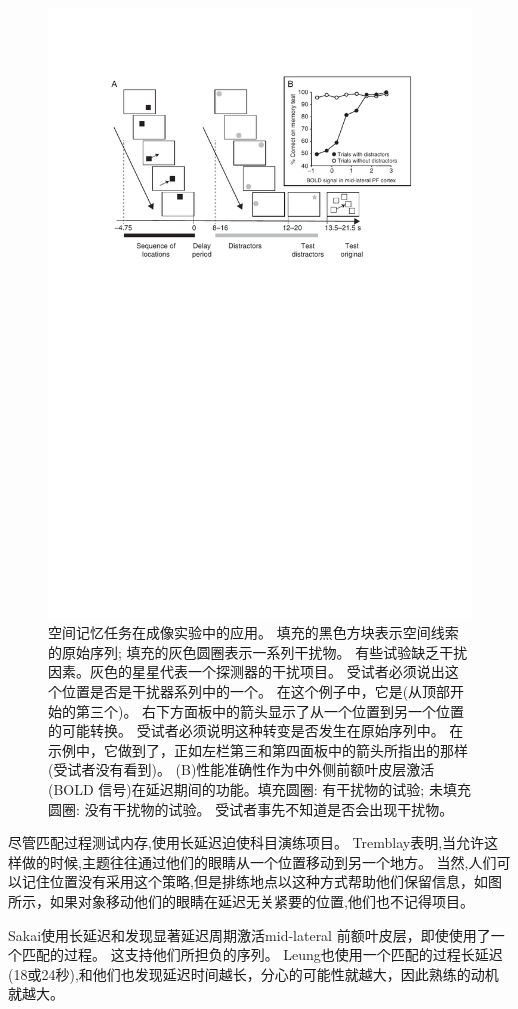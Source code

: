 \begin{figure}
	\centering
	\includegraphics[width=0.6\linewidth]{chap6/6_10}
	\caption{空间记忆任务在成像实验中的应用。
		填充的黑色方块表示空间线索的原始序列; 填充的灰色圆圈表示一系列干扰物。
		有些试验缺乏干扰因素。灰色的星星代表一个探测器的干扰项目。
		受试者必须说出这个位置是否是干扰器系列中的一个。
		在这个例子中，它是(从顶部开始的第三个)。
		右下方面板中的箭头显示了从一个位置到另一个位置的可能转换。
		受试者必须说明这种转变是否发生在原始序列中。
		在示例中，它做到了，正如左栏第三和第四面板中的箭头所指出的那样(受试者没有看到)。
		(B)性能准确性作为中外侧前额叶皮层激活(BOLD 信号)在延迟期间的功能。填充圆圈: 有干扰物的试验; 未填充圆圈: 没有干扰物的试验。
		受试者事先不知道是否会出现干扰物\cite{sakai2002active}。}
	\label{fig:6_10}
\end{figure}


尽管匹配过程测试内存,使用长延迟迫使科目演练项目。
Tremblay\cite{tremblay2006rehearsal}表明,当允许这样做的时候,主题往往通过他们的眼睛从一个位置移动到另一个地方。
当然,人们可以记住位置没有采用这个策略,但是排练地点以这种方式帮助他们保留信息，如图所示，如果对象移动他们的眼睛在延迟无关紧要的位置,他们也不记得项目\cite{guerard2009processing}。


Sakai\cite{sakai2002active}使用长延迟和发现显著延迟周期激活mid-lateral 前额叶皮层，即使使用了一个匹配的过程。
这支持他们所担负的序列。
Leung\cite{leung2002sustained}也使用一个匹配的过程长延迟(18或24秒),和他们也发现延迟时间越长，分心的可能性就越大，因此熟练的动机就越大。


